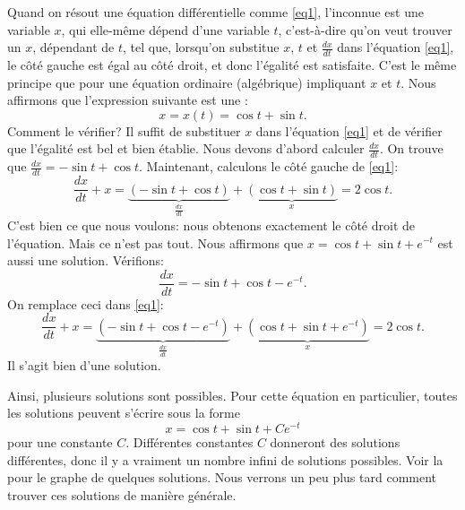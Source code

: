 Quand on résout une équation différentielle comme \eqref{eq1}, l'inconnue est une variable $x$, qui elle-même dépend d'une variable $t$, 
c'est-à-dire qu'on veut trouver un $x$, dépendant de $t$, tel que, lorsqu'on substitue $x$, $t$ et $\frac{dx}{dt}$ dans l'équation \eqref{eq1}, 
le côté gauche est égal au côté droit, et donc l'égalité est satisfaite.  C'est le même principe que pour une équation ordinaire (algébrique) impliquant $x$ et $t$.  
Nous affirmons que l'expression suivante est une \emph{}: 
\begin{equation*}
	x = x(t) = \cos t + \sin t .
\end{equation*}
%
Comment le vérifier?  Il suffit de substituer $x$ dans l'équation \eqref{eq1} et de vérifier que l'égalité est bel et bien établie.
Nous devons d'abord calculer $\frac{dx}{dt}$.  
On trouve que $\frac{dx}{dt} = -\sin t + \cos t$.  
Maintenant, calculons le côté gauche de \eqref{eq1}: 
\begin{equation*}
	\frac{dx}{dt} + x = \underbrace{(-\sin t + \cos t)}_{\frac{dx}{dt}}
						+ \underbrace{(\cos t + \sin t)}_{x}
					  = 2\cos t .
\end{equation*}
C'est bien ce que nous voulons: nous obtenons exactement le côté droit de l'équation.
Mais ce n'est pas tout. Nous affirmons que  $x = \cos t + \sin t + e^{-t}$ est aussi une solution.  
Vérifions: 
\begin{equation*}
	\frac{dx}{dt} = -\sin t + \cos t - e^{-t} .
\end{equation*}
On remplace ceci dans \eqref{eq1}: 
\begin{equation*}
	\frac{dx}{dt} + x = \underbrace{(-\sin t + \cos t - e^{-t})}_{\frac{dx}{dt}} 
						+ \underbrace{(\cos t + \sin t + e^{-t})}_{x} 
					  = 2\cos t .
\end{equation*}
Il s'agit bien d'une solution.

Ainsi, plusieurs solutions sont possibles.  Pour cette équation en particulier, toutes les solutions peuvent s'écrire sous la forme 
\begin{equation*}
	x = \cos t + \sin t + C e^{-t} 
\end{equation*}
pour une constante $C$.  Différentes constantes $C$ donneront des solutions différentes, donc il y a vraiment un nombre infini de solutions possibles.  
Voir la~ pour le graphe de quelques solutions.  
Nous verrons un peu plus tard comment trouver ces solutions de manière générale.

\medskip

